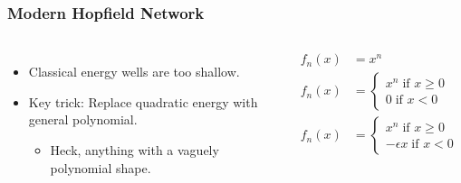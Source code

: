 \begin{frame}
	
    \frametitle{Modern Hopfield Network}
    \begin{columns}[c]
        \begin{itemize}
            \item Classical energy wells are too shallow.
            \item Key trick: Replace quadratic energy with general polynomial.
            \begin{itemize}
                \item Heck, anything with a vaguely polynomial shape.
            \end{itemize}
        \end{itemize}

        \begin{align*}
            f_n\left( x \right) &= x^n \\
            f_n\left( x \right) &= \begin{cases}
                x^n \; \text{if } x\geq0 \\
                0 \; \text{if } x<0
            \end{cases} \\
            f_n\left( x \right) &= \begin{cases}
                x^n \; \text{if } x\geq0 \\
                -\epsilon x \; \text{if } x<0
            \end{cases}
        \end{align*}

        
    \end{columns}
\end{frame}


